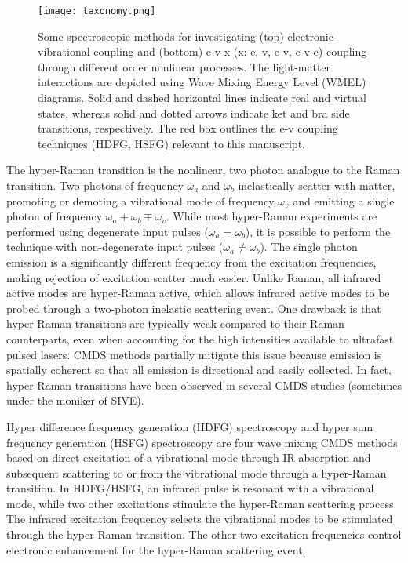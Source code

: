 \documentclass[aip, jcp, reprint, onecolumn, nofootinbib]{revtex4-2}
\begin{document}
\begin{figure}[!htbp]
	\centering
	\texttt{[image: taxonomy.png]}
	\caption{
		Some spectroscopic methods for investigating (top) electronic-vibrational coupling and (bottom) e-v-x (x: e, v, e-v, e-v-e) coupling through different order nonlinear processes.
		The light-matter interactions are depicted using Wave Mixing Energy Level (WMEL) diagrams.\cite{RN286}
		Solid and dashed horizontal lines indicate real and virtual states, whereas solid and dotted arrows indicate ket and bra side transitions, respectively. 
		The red box outlines the e-v coupling techniques (HDFG, HSFG) relevant to this manuscript.
	} %
	\label{fig:comparisonwmel}
\end{figure}

The hyper-Raman transition is the nonlinear, two photon analogue to the Raman transition.\cite{Terhune1965, Cyvin1965, Andrews1978}
Two photons of frequency $\omega_a$ and $\omega_b$ inelastically scatter with matter, promoting or demoting a vibrational mode of frequency $\omega_v$ and emitting a single photon of frequency $\omega_a + \omega_b \mp \omega_v$. 
While most hyper-Raman experiments are performed using degenerate input pulses ($\omega_a = \omega_b$), it is possible to perform the technique with non-degenerate input pulses ($\omega_a \neq \omega_b$). \cite{Denisov1986, Kozich2007}
The single photon emission is a significantly different frequency from the excitation frequencies, making rejection of excitation scatter much easier.
Unlike Raman, all infrared active modes are hyper-Raman active, which allows infrared active modes to be probed through a two-photon inelastic scattering event. \cite{Andrews1978}
One drawback is that hyper-Raman transitions are typically weak compared to their Raman counterparts, even when accounting for the high intensities available to ultrafast pulsed lasers.\cite{RN515, Kelley2010}
CMDS methods partially mitigate this issue because emission is spatially coherent so that all emission is directional and easily collected.
In fact, hyper-Raman transitions have been observed in several CMDS studies (sometimes under the moniker of SIVE).\cite{Zilian1994, RN350, RN416, RN351, RN352, RN353, Chen1998, RN362, RN418, Wang2021, Bonn2024, McDonnell2024}

Hyper difference frequency generation (HDFG) spectroscopy and hyper sum frequency generation (HSFG) spectroscopy are four wave mixing CMDS methods based on direct excitation of a vibrational mode through IR absorption and subsequent scattering to or from the vibrational mode through a hyper-Raman transition.
In HDFG/HSFG, an infrared pulse is resonant with a vibrational mode, while two other excitations stimulate the hyper-Raman scattering process.
The infrared excitation frequency selects the vibrational modes to be stimulated through the hyper-Raman transition.
The other two excitation frequencies control electronic enhancement for the hyper-Raman scattering event.
\end{document}
